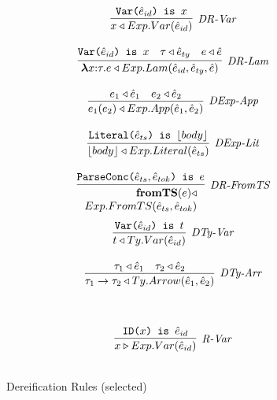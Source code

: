\begin{figure}[t]
\centering
\begin{minipage}[t]{.51\textwidth}
  \centering
   \[
\begin{array}{c}

\infer[\textit{DR-Var}]
	{ x \triangleleft Exp.Var(\hat{e}_{id})   }
	{ \texttt{Var($\hat{e}_{id}$) is $x$}} \\[3ex]

\infer[\textit{DR-Lam}]
	{ \boldsymbol\lambda x{:}\tau . e \triangleleft Exp.Lam( \hat{e}_{id}, \hat{e}_{ty}, \hat{e})  }
	{ \texttt{Var($\hat{e}_{id}$) is $x$} & \tau \triangleleft \hat{e}_{ty} & e \triangleleft \hat{e} } \\[3ex]

\infer[\textit{DExp-App}]
	{ e_1(e_2)  \triangleleft Exp.App(\hat{e}_1,\hat{e}_2) }
	{ e_1 \triangleleft \hat{e}_1  & e_2 \triangleleft \hat{e}_2   } \\[3ex]

\infer[\textit{DExp-Lit}]
	{ \lfloor body \rfloor \triangleleft Exp.Literal( \hat{e}_{ts} )  }
	{ \texttt{Literal($\hat{e}_{ts}$) is $\lfloor body \rfloor$}} \\[3ex]

\infer[\textit{DR-FromTS}]
          {\renewcommand{\arraystretch}{1}
	    \begin{array}{r}
	    \keyw{fromTS}(e) \triangleleft\\
            Exp.FromTS(\hat{e}_{ts},\hat{e}_{tok})
            \end{array}
       }
	  {\texttt{ParseConc($\hat{e}_{ts},\hat{e}_{tok}$) is $e$}}
	   \\[3ex] 

\infer[\textit{DTy-Var}]
	{ t \triangleleft Ty.Var(\hat{e}_{id})   }
	{ \texttt{Var($\hat{e}_{id}$) is $t$}} \\[3ex]

\infer[\textit{DTy-Arr}]
	{ \tau_1 \rightarrow \tau_2 \triangleleft Ty.Arrow(\hat{e}_1,\hat{e}_2 )  }
	{ \tau_1 \triangleleft \hat{e}_1 & \tau_2 \triangleleft \hat{e}_2 }
\end{array}
\]
\label{fig:dereification}
\vspace{-10px}
\caption{Dereification Rules (selected)}
\end{minipage}%
~\vline~
\begin{minipage}[t]{.44\textwidth}
  \centering
  \[
\begin{array}{c}
\infer[\textit{R-Var}]
	{ x \triangleright Exp.Var(\hat{e}_{id})   }
	{ \texttt{ID($x$) is $\hat{e}_{id}$}} \\[3ex]


\end{array}\]
\end{minipage}
\end{figure}

